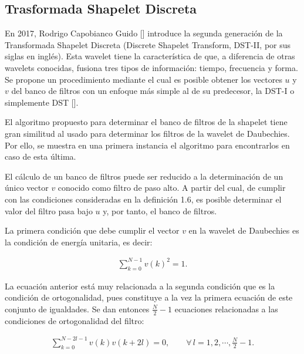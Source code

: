 \subsection{Trasformada Shapelet Discreta}

\par En 2017, Rodrigo Capobianco Guido [\cite{10}] introduce la segunda generaci\'on de la Transformada Shapelet Discreta (Discrete Shapelet Transform, DST-II, por sus siglas en ingl\'es). Esta wavelet tiene la caracter\'istica de que, a diferencia de otras wavelets conocidas, fusiona tres tipos de informaci\'on: tiempo, frecuencia y forma. Se propone un procedimiento mediante el cual es posible obtener los vectores $u$ y $v$ del banco de filtros con un enfoque m\'as simple al de su predecesor, la DST-I o simplemente DST [\cite{11}].

\par El algoritmo propuesto para determinar el banco de filtros de la shapelet tiene gran similitud al usado para determinar los filtros de la wavelet de Daubechies. Por ello, se muestra en una primera instancia el algoritmo para encontrarlos en caso de esta \'ultima.

\par El c\'alculo de un banco de filtros puede ser reducido a la determinaci\'on de un \'unico vector $v$ conocido como filtro de paso alto. A partir del cual, de cumplir con las condiciones consideradas en la definici\'on 1.6, es posible determinar el valor del filtro pasa bajo $u$ y, por tanto, el banco de filtros.

\par La primera condici\'on que debe cumplir el vector $v$ en la wavelet de Daubechies es la condici\'on de energ\'ia unitaria, es decir:

\begin{eqnarray}
\sum_{k=0}^{N-1}v(k)^2=1.
\label{energiaunitaria}
\end{eqnarray}

\par La ecuaci\'on anterior est\'a muy relacionada a la segunda condici\'on que es la condici\'on de ortogonalidad, pues constituye a la vez la primera ecuaci\'on de este conjunto de igualdades. Se dan entonces $\frac{N}{2}-1$ ecuaciones relacionadas a las condiciones de ortogonalidad del filtro:

\begin{eqnarray}
\sum_{k=0}^{N-2l-1}v(k)v(k+2l)=0,\qquad\forall\,l=1,2,\cdots,\frac{N}{2}-1.
\label{ortogonalidad}
\end{eqnarray}

